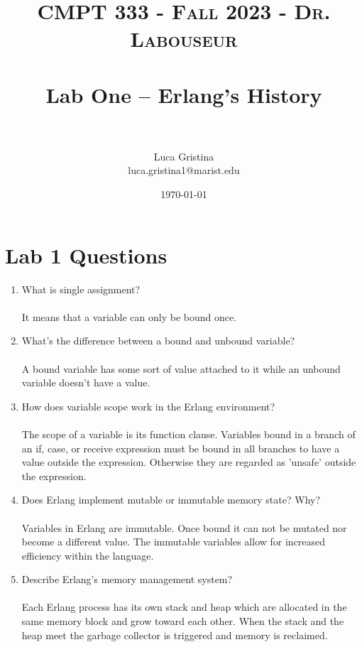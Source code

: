\documentclass[letterpaper, 10pt]{article}
\title{	
   \normalfont \normalsize 
   \textsc{CMPT 333 - Fall 2023 - Dr. Labouseur} \\[10pt] %
   \horrule{0.5pt} \\[0.25cm] 	%
   \huge Lab One -- Erlang's History \\     	    %
   \horrule{0.5pt} \\[0.25cm] 	%
}
\author{Luca Gristina \\ \normalsize luca.gristina1@marist.edu}
\date{\normalsize\today} 	%
\begin{document}
\maketitle %



\section{Lab 1 Questions}

\begin{enumerate}
    \item What is single assignment?
    \\\\
    It means that a variable can only be bound once.
    
    \item What's the difference between a bound and unbound variable?
    \\\\
    A bound variable has some sort of value attached to it while an unbound variable doesn't have a value.
    
    \item How does variable scope work in the Erlang environment?
    \\\\
    The scope of a variable is its function clause. Variables bound in a branch of an if, case, or receive expression must be bound in all branches to have a value outside the expression. Otherwise they are regarded as 'unsafe' outside the expression.

    \item Does Erlang implement mutable or immutable memory state? Why?
    \\\\
    Variables in Erlang are immutable. Once bound it can not be mutated nor become a different value. The immutable variables allow for increased efficiency within the language.

    \item Describe Erlang's memory management system?
    \\\\
    Each Erlang process has its own stack and heap which are allocated in the same memory block and grow toward each other. When the stack and the heap meet the garbage collector is triggered and memory is reclaimed.


\end{enumerate}
\end{document}
